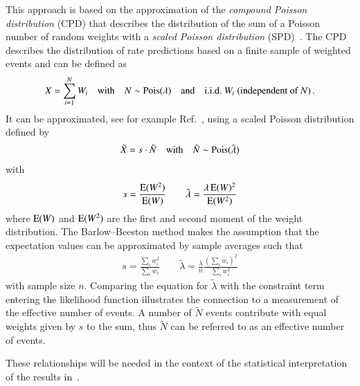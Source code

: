 This approach is based on the approximation of the \emph{compound Poisson
  distribution} (CPD) that describes the distribution of the sum of a Poisson
number of random weights with a \emph{scaled Poisson distribution}
(SPD)~\cite{Bohm:2013gla}. The CPD describes the distribution of rate
predictions based on a finite sample of weighted events and can be defined as
\begin{align*}
  X = \sum_{i = 1}^{N} W_i \quad \text{with} \quad N \sim \operatorname{Pois}(\lambda) \quad \text{and} \quad \text{i.i.d.\ } W_i \text{ (independent of }N\text{)} \,\text{.}
\end{align*}
It can be approximated, see for example Ref.~\cite{Bohm:2013gla}, using a scaled
Poisson distribution defined by
\begin{align*}
  \tilde{X} = s \cdot \tilde{N} \quad \text{with} \quad \tilde{N} \sim \operatorname{Pois}(\tilde{\lambda})
\end{align*}
with
\begin{align*}
  s = \frac{\operatorname{E}(W^2)}{\operatorname{E}(W)} \qquad \tilde{\lambda} = \frac{\lambda \operatorname{E}(W)^2}{\operatorname{E}(W^2)}
\end{align*}
where $\operatorname{E}(W)$ and $\operatorname{E}(W^2)$ are the first and second moment of the
weight distribution. The Barlow--Beeston method makes the assumption that the
expectation values can be approximated by sample averages such that
\begin{align*}
  s = \frac{\sum_i w_i^2}{\sum_i w_i} \qquad \tilde{\lambda} = \frac{\lambda}{n} \frac{(\sum_i w_i)^2}{\sum_i w_i^2}
\end{align*}
with sample size $n$. Comparing the equation for $\tilde{\lambda}$ with the
constraint term entering the likelihood function illustrates the connection to a
measurement of the effective number of events. A number of $\tilde{N}$ events
contribute with equal weights given by $s$ to the sum, thus $\tilde{N}$ can be
referred to as an effective number of events.

These relationships will be needed in the context of the statistical
interpretation of the results in~.

